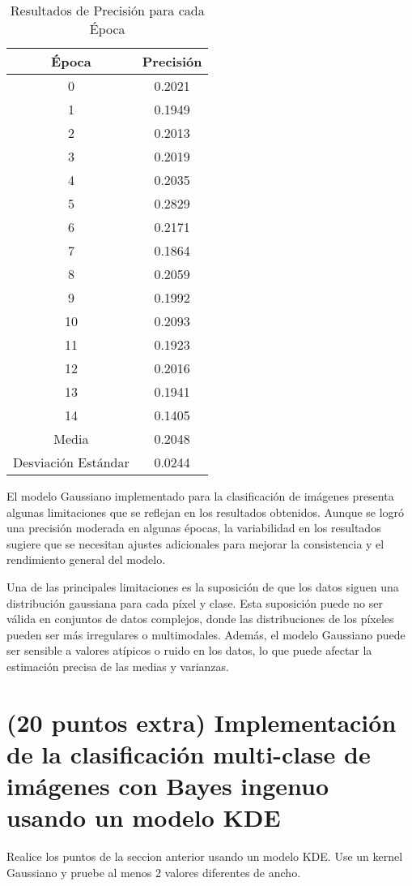 \documentclass[spanish]{article}
\begin{document}
\begin{table}[htbp]
\centering
\caption{Resultados de Precisión para cada Época}
\label{tab:accuracy_results}
\begin{tabular}{|c|c|}
\hline
Época & Precisión \\
\hline
0 & 0.2021 \\
1 & 0.1949 \\
2 & 0.2013 \\
3 & 0.2019 \\
4 & 0.2035 \\
5 & 0.2829 \\
6 & 0.2171 \\
7 & 0.1864 \\
8 & 0.2059 \\
9 & 0.1992 \\
10 & 0.2093 \\
11 & 0.1923 \\
12 & 0.2016 \\
13 & 0.1941 \\
14 & 0.1405 \\
\hline
Media & 0.2048 \\
Desviación Estándar & 0.0244 \\
\hline
\end{tabular}
\end{table}

El modelo Gaussiano implementado para la clasificación de imágenes presenta algunas limitaciones que se reflejan en los resultados obtenidos. Aunque se logró una precisión moderada en algunas épocas, la variabilidad en los resultados sugiere que se necesitan ajustes adicionales para mejorar la consistencia y el rendimiento general del modelo.

Una de las principales limitaciones es la suposición de que los datos siguen una distribución gaussiana para cada píxel y clase. Esta suposición puede no ser válida en conjuntos de datos complejos, donde las distribuciones de los píxeles pueden ser más irregulares o multimodales. Además, el modelo Gaussiano puede ser sensible a valores atípicos o ruido en los datos, lo que puede afectar la estimación precisa de las medias y varianzas.

\section{(20 puntos extra) Implementación de la clasificación multi-clase
de imágenes con Bayes ingenuo usando un modelo KDE}

Realice los puntos de la seccion anterior usando un modelo KDE. Use
un kernel Gaussiano y pruebe al menos 2 valores diferentes de ancho.
\end{document}
